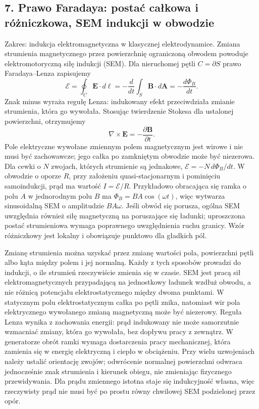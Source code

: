 \documentclass[11pt,a4paper]{article}
\begin{document}
\subsection{7. Prawo Faradaya: postać całkowa i różniczkowa, SEM indukcji w obwodzie}
Zakres: indukcja elektromagnetyczna w klasycznej elektrodynamice. Zmiana strumienia magnetycznego przez powierzchnię ograniczoną obwodem powoduje elektromotoryczną siłę indukcji (SEM). Dla nieruchomej pętli \(C=\partial S\) prawo Faradaya--Lenza zapisujemy
\[
\mathcal E=\oint_C\mathbf E\cdot d\boldsymbol\ell
=-\frac{d}{dt}\int_S\mathbf B\cdot d\mathbf A
=-\frac{d\Phi_B}{dt}.
\]
Znak minus wyraża regułę Lenza: indukowany efekt przeciwdziała zmianie strumienia, która go wywołała. Stosując twierdzenie Stokesa dla ustalonej powierzchni, otrzymujemy
\[
\nabla\times\mathbf E=-\frac{\partial\mathbf B}{\partial t}.
\]
Pole elektryczne wywołane zmiennym polem magnetycznym jest wirowe i nie musi być zachowawcze; jego całka po zamkniętym obwodzie może być niezerowa. Dla cewki o \(N\) zwojach, których strumienie są jednakowe, \(\mathcal E=-N\,d\Phi_B/dt\). W obwodzie o oporze \(R\), przy założeniu quasi-stacjonarnym i pominięciu samoindukcji, prąd ma wartość \(I=\mathcal E/R\). Przykładowo obracająca się ramka o polu \(A\) w jednorodnym polu \(B\) ma \(\Phi_B=BA\cos(\omega t)\), więc wytwarza sinusoidalną SEM o amplitudzie \(BA\omega\). Jeśli obwód się porusza, ogólna SEM uwzględnia również siłę magnetyczną na poruszające się ładunki; uproszczona postać strumieniowa wymaga poprawnego uwzględnienia ruchu granicy. Wzór różniczkowy jest lokalny i obowiązuje punktowo dla gładkich pól.

Zmianę strumienia można uzyskać przez zmianę wartości pola, powierzchni pętli albo kąta między polem i jej normalną. Każdy z tych sposobów prowadzi do indukcji, o ile strumień rzeczywiście zmienia się w czasie. SEM jest pracą sił elektromagnetycznych przypadającą na jednostkowy ładunek wzdłuż obwodu, a nie różnicą potencjału elektrostatycznego między dwoma punktami. W statycznym polu elektrostatycznym całka po pętli znika, natomiast wir pola elektrycznego wywołanego zmianą magnetyczną może być niezerowy. Reguła Lenza wynika z zachowania energii: prąd indukowany nie może samorzutnie wzmacniać zmiany, która go wywołała, bez dopływu pracy z zewnątrz. W generatorze obrót ramki wymaga dostarczenia pracy mechanicznej, która zamienia się w energię elektryczną i ciepło w obciążeniu. Przy wielu uzwojeniach należy ustalić orientację zwojów; odwrócenie normalnej powierzchni odwraca jednocześnie znak strumienia i kierunek obiegu, nie zmieniając fizycznego przewidywania. Dla prądu zmiennego istotna staje się indukcyjność własna, więc rzeczywisty prąd nie musi być po prostu równy chwilowej SEM podzielonej przez opór.
\end{document}
